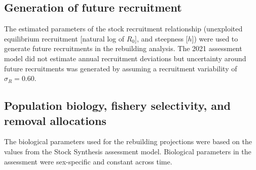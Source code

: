 \documentclass[11pt,
  english,
  a4paper,
]{article}
\begin{document}
\leavevmode\tagmcend\tagstructend\par


\hypertarget{generation-of-future-recruitment}{%
\subsection{Generation of future recruitment}\label{generation-of-future-recruitment}}

\leavevmode\tagmcend\tagstructend


The estimated parameters of the stock recruitment relationship (unexploited equilibrium recruitment {[}natural log of {\(R_0\)\leavevmode\tagmcend\tagstructend}{]}, and steepness {[}{\(h\)\leavevmode\tagmcend\tagstructend}{]}) were used to generate future recruitments in the rebuilding analysis. The 2021 assessment model did not estimate annual recruitment deviations but uncertainty around future recruitments was generated by assuming a recruitment variability of {\(\sigma_R = 0.60\)\leavevmode\tagmcend\tagstructend}.

\leavevmode\tagmcend\tagstructend\par


\hypertarget{population-biology-fishery-selectivity-and-removal-allocations}{%
\subsection{Population biology, fishery selectivity, and removal allocations}\label{population-biology-fishery-selectivity-and-removal-allocations}}

\leavevmode\tagmcend\tagstructend


The biological parameters used for the rebuilding projections were based on the values from the Stock Synthesis assessment model. Biological parameters in the assessment were sex-specific and constant across time.

\leavevmode\tagmcend\tagstructend\par

\end{document}
